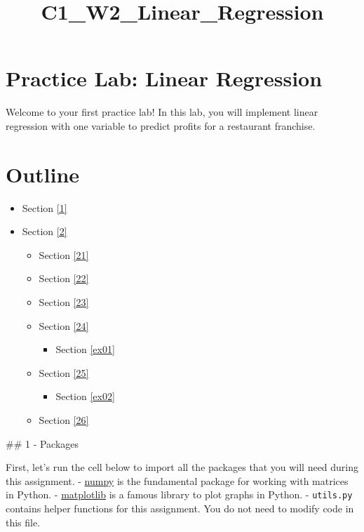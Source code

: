 \documentclass[11pt]{article}
\title{C1\_W2\_Linear\_Regression}
\providecommand{\tightlist}{%
      \setlength{\itemsep}{0pt}\setlength{\parskip}{0pt}}
\begin{document}
    
    \maketitle
    
    

    
    \hypertarget{practice-lab-linear-regression}{%
\section{Practice Lab: Linear
Regression}\label{practice-lab-linear-regression}}

Welcome to your first practice lab! In this lab, you will implement
linear regression with one variable to predict profits for a restaurant
franchise.

\hypertarget{outline}{%
\section{Outline}\label{outline}}

\begin{itemize}
\tightlist
\item
  Section \ref{1}
\item
  Section \ref{2}

  \begin{itemize}
  \tightlist
  \item
    Section \ref{21}
  \item
    Section \ref{22}
  \item
    Section \ref{23}
  \item
    Section \ref{24}

    \begin{itemize}
    \tightlist
    \item
      Section \ref{ex01}
    \end{itemize}
  \item
    Section \ref{25}

    \begin{itemize}
    \tightlist
    \item
      Section \ref{ex02}
    \end{itemize}
  \item
    Section \ref{26}
  \end{itemize}
\end{itemize}

    \#\# 1 - Packages

First, let's run the cell below to import all the packages that you will
need during this assignment. - \href{www.numpy.org}{numpy} is the
fundamental package for working with matrices in Python. -
\href{http://matplotlib.org}{matplotlib} is a famous library to plot
graphs in Python. - \texttt{utils.py} contains helper functions for this
assignment. You do not need to modify code in this file.
\end{document}

